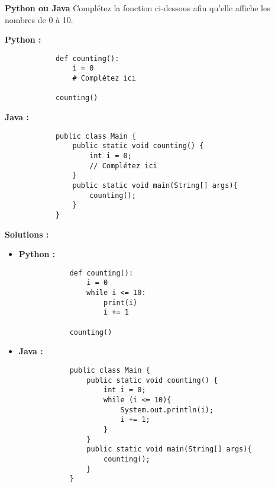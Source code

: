 \begin{Exercice}[5 minutes] \textbf{Python ou Java}
    Complétez la fonction ci-dessous afin qu'elle affiche les nombres de 0 à 10.
    
    \textbf{Python :}
        \begin{verbatim}
            def counting():
                i = 0
                # Complétez ici
            
            counting()
        \end{verbatim}
    
    \textbf{Java :}
        \begin{verbatim}
            public class Main {
                public static void counting() {
                    int i = 0;
                    // Complétez ici
                }
                public static void main(String[] args){
                    counting();
                }
            }
        \end{verbatim}
    
    \textbf{Solutions :}
    \begin{itemize}
        \item \textbf{Python :}
        \begin{verbatim}
            def counting():
                i = 0
                while i <= 10:
                    print(i)
                    i += 1
            
            counting()
        \end{verbatim}
        
        \item \textbf{Java :}
        \begin{verbatim}
            public class Main {
                public static void counting() {
                    int i = 0;
                    while (i <= 10){
                        System.out.println(i);
                        i += 1;
                    }
                }
                public static void main(String[] args){
                    counting();
                }
            }
        \end{verbatim}
    \end{itemize}

\end{Exercice}

\newpage

